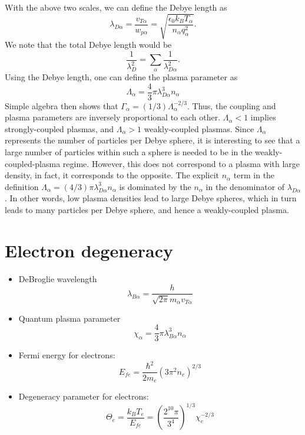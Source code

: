\documentclass[a4paper,11pt]{report}
\begin{document}
With the above two scales, we can define the Debye length as
\begin{equation}
    \lambda_{D\alpha} = \frac{v_{T\alpha}}{w_{p\alpha}} = \sqrt{ \dfrac{\epsilon_0 k_B T_\alpha}{ n_\alpha q_\alpha^2}}.
\end{equation}
We note that the total Debye length would be
\begin{equation}
    \frac{1}{\lambda_D^2} = \sum_\alpha \frac{1}{\lambda_{D\alpha}^2}.
\end{equation}
Using the Debye length, one can define the plasma parameter as
\begin{equation}
    \Lambda_\alpha = \frac{4}{3} \pi \lambda_{D\alpha}^3 n_\alpha
\end{equation}
Simple algebra then shows that $\Gamma_\alpha = (1/3) \Lambda_\alpha^{-2/3}$. Thus, the coupling and plasma parameters are inversely proportional to each other. $\Lambda_\alpha < 1$ implies strongly-coupled plasmas, and $\Lambda_\alpha > 1$ weakly-coupled plasmas. Since $\Lambda_\alpha$ represents the number of particles per Debye sphere, it is interesting to see that a large number of particles within such a sphere is needed to be in the weakly-coupled-plasma regime. However, this does not correspond to a plasma with large density, in fact, it corresponds to the opposite. The explicit $n_\alpha$ term in the definition $\Lambda_\alpha = (4/3) \pi \lambda^3_{D\alpha} n_\alpha$ is dominated by the $n_\alpha$ in the denominator of $\lambda_{D\alpha}$. In other words, low plasma densities lead to large Debye spheres, which in turn leads to many particles per Debye sphere, and hence a weakly-coupled plasma.

\section{Electron degeneracy}
\begin{itemize}
    \item DeBroglie wavelength
    \begin{equation}
        \lambda_{B\alpha} = \dfrac{h}{\sqrt{2 \pi} m_\alpha v_{T\alpha}}
    \end{equation}
    \item Quantum plasma parameter
    \begin{equation}
        \chi_\alpha = \frac{4}{3} \pi \lambda_{B\alpha}^3 n_\alpha
    \end{equation}
    
    \item Fermi energy for electrons:
    \begin{equation}
        E_{fe} = \frac{\hbar^2}{2m_e} \left ( 3 \pi^2 n_e \right)^{2/3}
    \end{equation}

    \item Degeneracy parameter for electrons:
    \begin{equation}
        \Theta_e = \frac{k_B T_e}{E_{fe}} = \left( \frac{2^{10} \pi}{3^4} \right)^{1/3} \chi_e^{-2/3}
    \end{equation}
\end{itemize}
\end{document}
